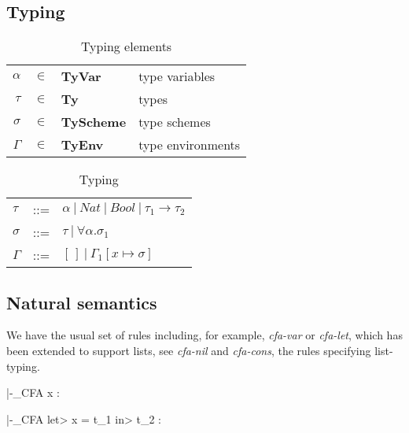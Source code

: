 \documentclass[a4paper]{article}
\begin{document}
\subsection{Typing}

\begin{table}
    \centering
    \begin{tabular}{rcll}
        $\alpha$ &      $\in$ & \textbf{TyVar}    & type variables  \\
        $\tau$&         $\in$ & \textbf{Ty}       & types \\
        $\sigma $&      $\in$ & \textbf{TyScheme} & type schemes\\
        $\Gamma$&       $\in$ & \textbf{TyEnv}    & type environments  \\
    \end{tabular}
    \caption{Typing elements}
    \label{tab:typingelems}
\end{table}
\begin{table}
    \centering
    \begin{tabular}{lcl}
        $\tau$   & ::= & $\alpha \:|\: Nat \: | \: Bool \: | \: \tau_1 \rightarrow \tau_2 $ \\ 
        $\sigma$ & ::= & $\tau \:|\: \forall \alpha. \sigma_1 $ \\ 
        $\Gamma$ & ::= & $[\,] \:|\: \Gamma_1[x \mapsto \sigma] $ \\
    \end{tabular}
    \caption{Typing}
    \label{tab:typing}
\end{table}


\subsection{Natural semantics}

We have the usual set of rules including, for example,  \emph{cfa-var} or \emph{cfa-let}, which has been extended to support lists, see \emph{cfa-nil} and \emph{cfa-cons}, the rules specifying list-typing. 

{\widehat{\Gamma} |-_{CFA} x  : \widehat{\sigma}}

{\widehat{\Gamma} |-_{CFA}\: \<let>\: x = t_1\: \<in>\: t_2 : \widehat{\tau}}
\end{document}
